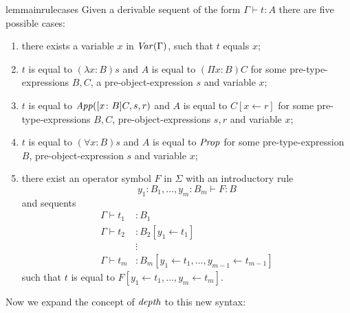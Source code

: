 \begin{restatable}{lemma}{inrulecases} \label{lemma:in-rule-cases}
    Given a derivable sequent of the form $\Gamma \vdash t \colon A$ there are five possible cases:
    \begin{enumerate}
        \item there exists a variable $x$ in $\operatorname{\mathit{Var}}(\Gamma)$, such that $t$ equals $x$;
        \item $t$ is equal to $(\lambda x \colon B) s$ and $A$ is equal to $(\Pi x \colon B) C$ for some pre-type-expressions $B, C$, a pre-object-expression $s$ and variable $x$;
        \item $t$ is equal to $\operatorname{\mathit{App}}([x \colon B] C, s, r)$ and $A$ is equal to $C[x \leftarrow r]$ for some pre-type-expressions $B, C$, pre-object-expressions $s, r$ and variable $x$;
        \item $t$ is equal to $(\forall x \colon B) s$ and $A$ is equal to $\operatorname{\mathit{Prop}}$ for some pre-type-expression $B$, pre-object-expression $s$ and variable $x$;
        \item there exist an operator symbol $F$ in $\Sigma$ with an introductory rule $$y_1 \colon B_1, \dots, y_m \colon B_m \vdash F \colon B$$ and sequents
             \begin{align*}
                \Gamma \vdash t_1 &\colon B_1 \\
                \Gamma \vdash t_2 &\colon B_2[y_1 \leftarrow t_1] \\
                &\vdots \\
                \Gamma \vdash t_m &\colon B_m[y_1 \leftarrow t_1, \dots, y_{m-1} \leftarrow t_{m-1}]
            \end{align*}
            such that $t$ is equal to $F[y_1 \leftarrow t_1, \dots, y_m \leftarrow t_m]$.
    \end{enumerate}
\end{restatable}

Now we expand the concept of $\operatorname{\mathit{depth}}$ to this new syntax:

